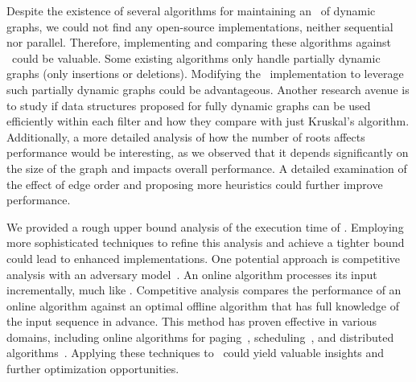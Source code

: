 Despite the existence of several algorithms for maintaining an \mst\ of dynamic graphs, we could not find any open-source implementations, neither sequential nor parallel. Therefore, implementing and comparing these algorithms against \DPmst\ could be valuable. Some existing algorithms only handle partially dynamic graphs (only insertions or deletions). Modifying the \DPmst\ implementation to leverage such partially dynamic graphs could be advantageous. Another research avenue is to study if data structures proposed for fully dynamic graphs can be used efficiently within each filter and how they compare with just Kruskal's algorithm. Additionally, a more detailed analysis of how the number of roots affects performance would be interesting, as we observed that it depends significantly on the size of the graph and impacts overall performance. A detailed examination of the effect of edge order and proposing more heuristics could further improve performance.

We provided a rough upper bound analysis of the execution time of \DPmst. Employing more sophisticated techniques to refine this analysis and achieve a tighter bound could lead to enhanced implementations. One potential approach is competitive analysis with an adversary model~\cite{Karp1992OnLineAV}. An online algorithm processes its input incrementally, much like \DPmst. Competitive analysis compares the performance of an online algorithm against an optimal offline algorithm that has full knowledge of the input sequence in advance. This method has proven effective in various domains, including online algorithms for paging~\cite{SleatorTarjan1985}, scheduling~\cite{Awebuch1992}, and distributed algorithms~\cite{Aspnes1998}. Applying these techniques to \DPmst\ could yield valuable insights and further optimization opportunities.
